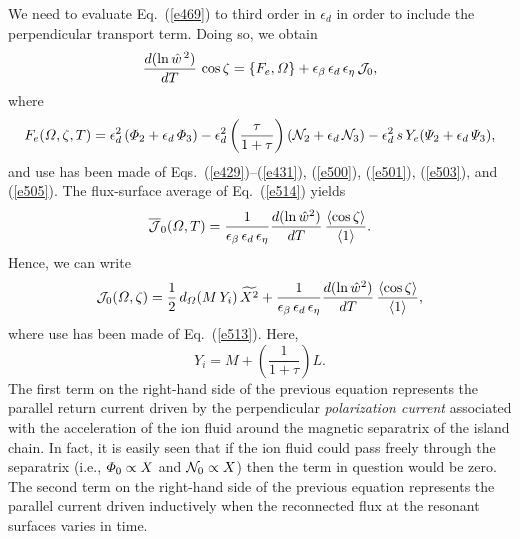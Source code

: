 \documentclass[12pt,prb,aps]{revtex4-1}
\begin{document}
We need to evaluate Eq.~(\ref{e469}) to third order in $\epsilon_d$ in order to include the perpendicular transport term. Doing so,
we obtain
\begin{equation}\label{e514}
\frac{d(\ln \hat{w}^{\,2})}{dT}\,\cos\zeta = \{F_e, {\mit\Omega}\} + \epsilon_\beta\,\epsilon_d\,\epsilon_\eta\,{\cal J}_0,
\end{equation}
where
\begin{equation}
F_e({\mit\Omega},\zeta,T)= \epsilon_d^2\,({\mit\Phi}_2+\epsilon_d\,{\mit\Phi}_3)-\epsilon_d^{2}\left(\frac{\tau}{1+\tau}\right)({\cal N}_2+\epsilon_d\,{\cal N}_3)
- \epsilon_d^2\,s\,Y_e({\mit\Psi}_2+\epsilon_d\,{\mit\Psi}_3),
\end{equation}
and use has been made of Eqs.~(\ref{e429})--(\ref{e431}), (\ref{e500}), (\ref{e501}), (\ref{e503}), and (\ref{e505}). 
The flux-surface average of Eq.~(\ref{e514}) yields
\begin{equation}
\overline{\cal J}_0({\mit\Omega},T) = \frac{1}{\epsilon_\beta\,\epsilon_d\,\epsilon_\eta}\frac{d(\ln \hat{w}^{2})}{dT}\,\frac{\langle\cos\zeta\rangle}{\langle 1\rangle}.
\end{equation}
 Hence, we
can write
\begin{equation}\label{e524a}
{\cal J}_0({\mit\Omega},\zeta)= 
\frac{1}{2}\,d_{\mit\Omega}\!\left(M\,Y_i\right)\widetilde{X^2}+ \frac{1}{\epsilon_\beta\,\epsilon_d\,\epsilon_\eta}\frac{d(\ln \hat{w}^{2})}{dT}\,\frac{\langle\cos\zeta\rangle}{\langle 1\rangle},
\end{equation}
where use has been made of Eq.~(\ref{e513}). Here, 
\begin{equation}\label{yi}
Y_i= M + \left(\frac{1}{1+\tau}\right)L.
\end{equation} 
The first term on the right-hand side of the previous equation represents the parallel return current driven by the perpendicular {\em polarization current}\/ associated with the
acceleration of the ion fluid around the magnetic separatrix of the island chain.\cite{smol1,smol2} 
In fact, it is easily seen that if the ion fluid could pass freely through the separatrix (i.e., ${\mit\Phi}_0\propto X$ and ${\cal N}_0\propto X$) then the term in question would be zero. The second term on the right-hand side of the previous equation represents the parallel current driven
inductively when the reconnected flux at the resonant surfaces varies in time. 
\end{document}
